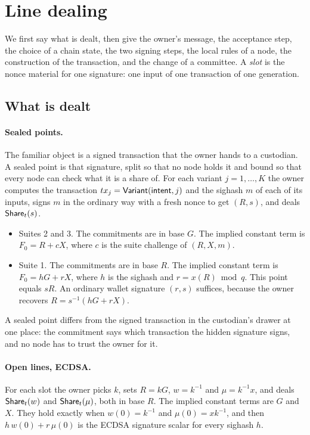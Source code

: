 \section{Line dealing}\label{sec:construction}

We first say what is dealt, then give the owner's message, the acceptance step, the choice of a chain state, the two signing steps, the local rules of a node, the construction of the transaction, and the change of a committee. A \emph{slot} is the nonce material for one signature: one input of one transaction of one generation.

\subsection{What is dealt}\label{sec:dealt}

\paragraph{Sealed points.} The familiar object is a signed transaction that the owner hands to a custodian. A sealed point is that signature, split so that no node holds it and bound so that every node can check what it is a share of. For each variant $j = 1,\dots,K$ the owner computes the transaction $tx_j = \mathsf{Variant}(\textsf{intent}, j)$ and the sighash $m$ of each of its inputs, signs $m$ in the ordinary way with a fresh nonce to get $(R, s)$, and deals $\mathsf{Share}_t(s)$.

\begin{itemize}[leftmargin=1.5em]
\item Suites 2 and 3. The commitments are in base $G$. The implied constant term is $F_0 = R + cX$, where $c$ is the suite challenge of $(R, X, m)$.
\item Suite 1. The commitments are in base $R$. The implied constant term is $F_0 = hG + rX$, where $h$ is the sighash and $r = x(R) \bmod q$. This point equals $sR$. An ordinary wallet signature $(r,s)$ suffices, because the owner recovers $R = s^{-1}(hG + rX)$.
\end{itemize}

A sealed point differs from the signed transaction in the custodian's drawer at one place: the commitment says which transaction the hidden signature signs, and no node has to trust the owner for it.

\paragraph{Open lines, ECDSA.} For each slot the owner picks $k$, sets $R = kG$, $w = k^{-1}$ and $\mu = k^{-1}x$, and deals $\mathsf{Share}_t(w)$ and $\mathsf{Share}_t(\mu)$, both in base $R$. The implied constant terms are $G$ and $X$. They hold exactly when $w(0) = k^{-1}$ and $\mu(0) = x k^{-1}$, and then $h\,w(0) + r\,\mu(0)$ is the ECDSA signature scalar for every sighash $h$.

